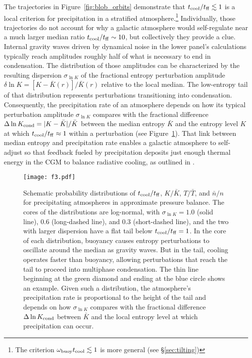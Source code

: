 \documentclass[twocolumn]{aastex63}
\begin{document}
The trajectories in Figure~\ref{fig:blob_orbits} demonstrate that $t_{\rm cool} / t_{\rm ff} \lesssim 1$ is a local criterion for precipitation in a stratified atmosphere.\footnote{The criterion $\omega_{\rm buoy} t_{\rm cool} \lesssim 1$ is more general (see \S \ref{sec:tilting})}  Individually, those trajectories do not account for why a galactic atmosphere would self-regulate near a much larger median ratio $t_{\rm cool} / t_{\rm ff} \sim 10$, but collectively they provide a clue.  Internal gravity waves driven by dynamical noise in the lower panel's calculations typically reach amplitudes roughly half of what is necessary to end in condensation.  The distribution of those amplitudes can be characterized by the resulting dispersion $\sigma_{\ln K}$ of the fractional entropy perturbation amplitude $\delta \ln K = [K - \bar{K}(r)] / \bar{K}(r)$ relative to the local median.  The low-entropy tail of that distribution represents perturbations transitioning into condensation.  Consequently, the precipitation rate of an atmosphere depends on how its typical perturbation amplitude $\sigma_{\ln K}$ compares with the fractional difference $ \Delta \ln K_{\rm cond} = | K - \bar{K} | / \bar{K}$ between the median entropy $\bar{K}$ and the entropy level $K$ at which $t_{\rm cool} / t_{\rm ff} \approx 1$ within a perturbation (see Figure~\ref{fig:tctff_pdf}). That link between median entropy and precipitation rate enables a galactic atmosphere to self-adjust so that feedback fueled by precipitation deposits just enough thermal energy in the CGM to balance radiative cooling, as outlined in \citet{Voit_2018ApJ...868..102V}.

\begin{figure}[t]
\texttt{[image: f3.pdf]}
\caption{Schematic probability distributions of $t_{\rm cool} / t_{\rm ff}$, $K/\bar{K}$, $T/\bar{T}$, and $\bar{n}/n$ for precipitating atmospheres in approximate pressure balance.  The cores of the distributions are log-normal, with $\sigma_{\ln K} = 1.0$ (solid line), 0.6 (long-dashed line), and 0.3 (short-dashed line), and the two with larger dispersion have a flat tail below $t_{\rm cool} / t_{\rm ff} = 1$.  In the core of each distribution, buoyancy causes entropy perturbations to oscillate around the median as gravity waves.  But in the tail, cooling operates faster than buoyancy, allowing perturbations that reach the tail to proceed into multiphase condensation.  The thin line beginning at the green diamond and ending at the blue circle shows an example.  Given such a distribution, the atmosphere's precipitation rate is proportional to the height of the tail and depends on how $\sigma_{\ln K}$ compares with the fractional difference $ \Delta \ln K_{\rm cond}$ between $\bar{K}$ and the local entropy level at which precipitation can occur. 
\label{fig:tctff_pdf}}
\end{figure}
\end{document}
